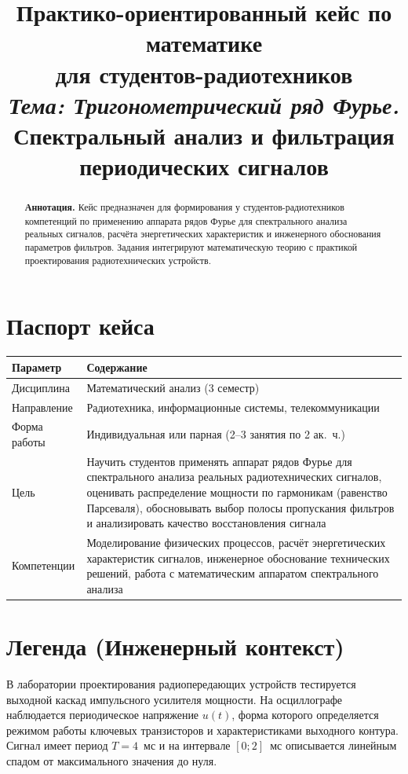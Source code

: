 \documentclass[a4paper,12pt]{article}
\title{\vspace{-2cm}\textbf{Практико-ориентированный кейс по математике}\\[0.5cm]
\large для студентов-радиотехников\\[0.3cm]
\textit{Тема: Тригонометрический ряд Фурье.}\\ Спектральный анализ и фильтрация периодических сигналов}
\author{}
\date{}
\begin{document}
\maketitle
\thispagestyle{fancy}

\begin{abstract}
\noindent\textbf{Аннотация.} Кейс предназначен для формирования у студентов-радиотехников компетенций по применению аппарата рядов Фурье для спектрального анализа реальных сигналов, расчёта энергетических характеристик и инженерного обоснования параметров фильтров. Задания интегрируют математическую теорию с практикой проектирования радиотехнических устройств.
\end{abstract}

\tableofcontents
\newpage

\section{Паспорт кейса}
\begin{center}
\renewcommand{\arraystretch}{1.4}
\begin{tabularx}{\textwidth}{@{}lX@{}}
\toprule
\textbf{Параметр} & \textbf{Содержание} \\
\midrule
Дисциплина & Математический анализ (3 семестр) \\
Направление & Радиотехника, информационные системы, телекоммуникации \\
Форма работы & Индивидуальная или парная (2--3 занятия по 2 ак.~ч.) \\
Цель & Научить студентов применять аппарат рядов Фурье для спектрального анализа реальных радиотехнических сигналов, оценивать распределение мощности по гармоникам (равенство Парсеваля), обосновывать выбор полосы пропускания фильтров и анализировать качество восстановления сигнала \\
Компетенции & Моделирование физических процессов, расчёт энергетических характеристик сигналов, инженерное обоснование технических решений, работа с математическим аппаратом спектрального анализа \\
\bottomrule
\end{tabularx}
\end{center}

\section{Легенда (Инженерный контекст)}
В лаборатории проектирования радиопередающих устройств тестируется выходной каскад импульсного усилителя мощности. На осциллографе наблюдается периодическое напряжение $u(t)$, форма которого определяется режимом работы ключевых транзисторов и характеристиками выходного контура. Сигнал имеет период $T = 4$~мс и на интервале $[0; 2]$~мс описывается линейным спадом от максимального значения до нуля.
\end{document}
